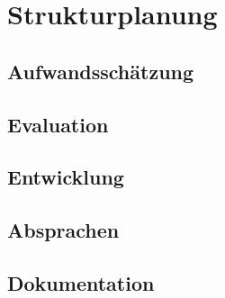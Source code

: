 
\chapter{Strukturplanung}

\section{Aufwandsschätzung}

\section{Evaluation}

\section{Entwicklung}

\section{Absprachen}

\section{Dokumentation}